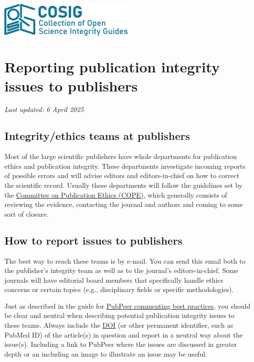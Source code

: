 \documentclass[letterpaper, 12pt]{article}
\begin{document}
\flushleft
\includegraphics[width=0.5\textwidth]{img/home/241017_final_logo_mockup.png}

\section*{Reporting publication integrity issues to publishers}
\textit{Last updated: 6 April 2025}

\subsection*{Integrity/ethics teams at publishers}

Most of the large scientific publishers have whole departments for publication ethics and publication integrity. These departments investigate incoming reports of possible errors and will advise editors and editors-in-chief on how to correct the scientific record. Usually these departments will follow the guidelines set by the \href{https://publicationethics.org/}{Committee on Publication Ethics (COPE)}, which generally consists of reviewing the evidence, contacting the journal and authors and coming to some sort of closure.

\subsection*{How to report issues to publishers}

The best way to reach these teams is by e-mail. You can send this email both to the publisher's integrity team as well as to the journal's editors-in-chief. Some journals will have editorial board members that specifically handle ethics concerns or certain topics (e.g., disciplinary fields or specific methodologies).

Just as described in the guide for \href{https://osf.io/sghaq}{PubPeer commenting best practices}, you should be clear and neutral when describing potential publication integrity issues to these teams. Always include the \href{https://www.doi.org/}{DOI} (or other permanent identifier, such as PubMed ID) of the article(s) in question and report in a neutral way about the issue(s). Including a link to PubPeer where the issues are discussed in greater depth or an including an image to illustrate an issue may be useful.
\end{document}
